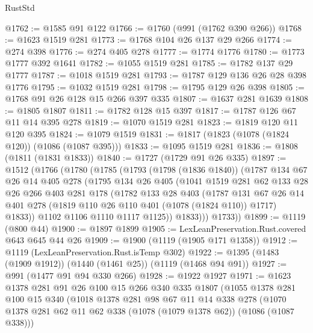 \begin{lexlean}{RustStd}
\begin{coremodule}
@1762 := @1585 @91 @122
@1766 := @1760 (@991 (@1762 @390 @266))
@1768 := @1623 @1519 @281
@1773 := @1768 @104 @26 @137 @29 @266
@1774 := @274 @398
@1776 := @274 @405 @278
@1777 := @1774 @1776
@1780 := @1773 @1777 @392 @1641
@1782 := @1055 @1519 @281
@1785 := @1782 @137 @29 @1777
@1787 := @1018 @1519 @281
@1793 := @1787 @129 @136 @26 @28 @398 @1776
@1795 := @1032 @1519 @281
@1798 := @1795 @129 @26 @398
@1805 := @1768 @91 @26 @128 @15 @266 @397 @335
@1807 := @1637 @281 @1639
@1808 := @1805 @1807
@1811 := @1782 @128 @15 @397
@1817 := @1787 @126 @67 @11 @14 @395 @278
@1819 := @1070 @1519 @281
@1823 := @1819 @120 @11 @120 @395
@1824 := @1079 @1519
@1831 := @1817 (@1823 (@1078 (@1824 @120)) (@1086 (@1087 @395)))
@1833 := @1095 @1519 @281
@1836 := @1808 (@1811 (@1831 @1833))
@1840 := @1727 (@1729 @91 @26 @335)
@1897 := @1512
    (@1766
      (@1780
        (@1785
          (@1793
            (@1798 (@1836 @1840))
            (@1787
              @134
              @67
              @26
              @14
              @405
              @278
              (@1795
                @134
                @26
                @405
                (@1041
                  @1519
                  @281
                  @62
                  @133
                  @28
                  @26
                  @266
                  @403
                  @281
                  @178
                  (@1782
                    @133
                    @28
                    @403
                    (@1787
                      @131
                      @67
                      @26
                      @14
                      @401
                      @278
                      (@1819 @110 @26 @110 @401 (@1078 (@1824 @110)) @1717)
                      @1833))
                  @1102
                  @1106
                  @1110
                  @1117
                  @1125))
              @1833)))
        @1733))
@1899 := @1119 (@800 @44)
@1900 := @1897 @1899
@1905 := LexLeanPreservation.Rust.covered @643 @645 @44 @26
@1909 := @1900 (@1119 (@1905 @171 @1358))
@1912 := @1119 (LexLeanPreservation.Rust.isTemp @302)
@1922 := @1395 (@1483 (@1909 @1912)) (@1440 (@1461 @25)) (@1119 (@1468 @94 @91))
@1927 := @991 (@1477 @91 @94 @330 @266)
@1928 := @1922 @1927
@1971 := @1623
    @1378
    @281
    @91
    @26
    @100
    @15
    @266
    @340
    @335
    @1807
    (@1055
      @1378
      @281
      @100
      @15
      @340
      (@1018
        @1378
        @281
        @98
        @67
        @11
        @14
        @338
        @278
        (@1070 @1378 @281 @62 @11 @62 @338 (@1078 (@1079 @1378 @62)) (@1086 (@1087 @338)))

\end{coremodule}
\end{lexlean}
